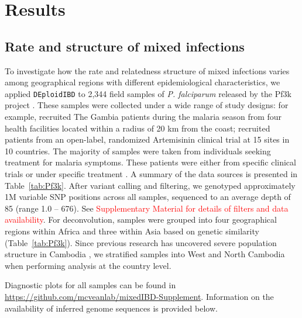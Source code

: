 \documentclass[9pt,lineno]{elife}
\begin{document}
\begin{figure}[htp]
\end{figure}




\section{Results}

\subsection{Rate and structure of mixed infections}

To investigate how the rate and relatedness structure of mixed infections varies among geographical regions with different epidemiological characteristics, we applied \texttt{DEploidIBD} to 2,344 field samples of {\it P. falciparum} released by the Pf3k project \citep{pf3k}.  These samples were collected under a wide range of study designs: for example, \citet{Amambua-Ngwa2012} recruited The Gambia patients during the malaria season from four health facilities located within a radius of 20 km from the coast; \citet{Ashley2014} recruited patients from an open-label, randomized Artemisinin clinical trial at 15 sites in 10 countries. The majority of samples were taken from individuals seeking treatment for malaria symptoms. These patients were either from specific clinical trials \citep{Ocholla2014} or under specific treatment \citep{Duffy2015, Miotto2013, eLife2016}.  A summary of the data sources is presented in Table~\ref{tab:Pf3k}.  After variant calling and filtering, we genotyped approximately 1M variable SNP positions across all samples, sequenced to an average depth of 85 (range 1.0 – 676).  See \textcolor{red}{Supplementary Material for details of filters and data availability}.  For deconvolution, samples were grouped into four geographical regions within Africa and three within Asia based on genetic similarity (Table~\ref{tab:Pf3k}). Since previous research has uncovered severe population structure in Cambodia \citep{Miotto2013}, we stratified samples into West and North Cambodia when performing analysis at the country level.

Diagnostic plots for all samples can be found in \url{https://github.com/mcveanlab/mixedIBD-Supplement}. Information on the availability of inferred genome sequences is provided below.
\end{document}
